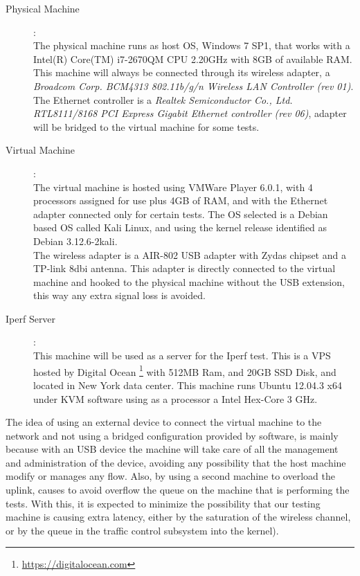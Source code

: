 \begin{description}

\item [Physical Machine]: \hfill \\
The physical machine runs as host OS, Windows 7 SP1, that works with a Intel(R)
Core(TM) i7-2670QM CPU \@ 2.20GHz with 8GB of available RAM. This machine will 
always be connected through its wireless adapter, a \textit{Broadcom Corp. 
BCM4313 802.11b/g/n Wireless LAN Controller (rev 01)}. The Ethernet controller 
is a \textit{Realtek Semiconductor Co., Ltd. RTL8111/8168 PCI Express Gigabit 
Ethernet controller (rev 06)}, adapter will be bridged to the virtual 
machine for some tests.\\

\item[Virtual Machine]: \hfill \\
The virtual machine is hosted using VMWare Player 6.0.1, with 4 processors 
assigned for use plus 4GB of RAM, and with the Ethernet adapter connected only
for certain tests. The OS selected is a Debian based OS called Kali Linux, and
using the kernel release identified as Debian 3.12.6-2kali.\\

The wireless adapter is a AIR-802 USB adapter with Zydas chipset and a TP-link
8dbi antenna. This adapter is directly connected to the virtual machine and
hooked to the physical machine without the USB extension, this way any extra
signal  loss is avoided. \\

\item[Iperf Server]: \hfill \\
This machine will be used as a server for the Iperf test. This is a VPS hosted 
by Digital Ocean \footnote{\url{https://digitalocean.com}} with 512MB Ram, and 
20GB SSD Disk, and located in New York data center. This machine runs Ubuntu 
12.04.3 x64 under KVM software using as a processor a Intel Hex-Core 3 GHz.

\end{description}

The idea of using an external device to connect the virtual machine to the 
network and not using a bridged configuration provided by software, is mainly 
because with an USB device the machine will take care of all the management and 
administration of the device, avoiding any possibility that the host machine 
modify or manages any flow. Also, by using a second machine to overload the 
uplink, causes to avoid overflow the queue on the machine that is performing 
the tests. With this, it is expected to minimize the possibility that our 
testing machine is causing extra latency, either by the saturation of the 
wireless channel, or by the queue in the traffic control subsystem into the 
kernel). \\

